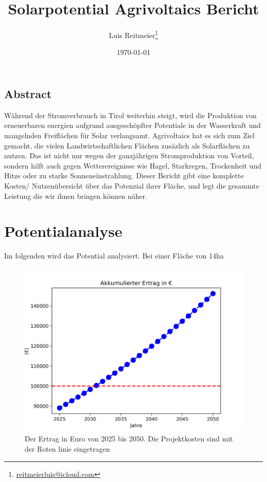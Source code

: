 \documentclass[12pt,a4paper,notitlepage]{scrreprt}
\title{\centering Solarpotential Agrivoltaics Bericht}
\author{Luis Reitmeier\thanks{\href{mailto:reitmeierluis@icloud.com}{reitmeierluis@icloud.com}}}
\date{\today}
\begin{document}

\maketitle

\vfill
    \section*{Abstract}
    Während der Stromverbrauch in Tirol weiterhin steigt, wird die Produktion von erneuerbaren energien aufgrund ausgeschöpfter Potentiale in der Wasserkraft und mangelnden Freiflächen für Solar verlangsamt. Agrivoltaics hat es sich zum Ziel gemacht, die vielen Landwirtschaftlichen Flächen zusäzlich als Solarflächen zu nutzen. Das ist nicht nur wegen der ganzjährigen Stromproduktion von Vorteil, sondern hilft auch gegen Wetterereignisse wie Hagel, Starkregen, Trockenheit und Hitze oder zu starke Sonneneinstrahlung. Dieser Bericht gibt eine komplette Kosten/ Nutzenübersicht über das Potenzial ihrer Fläche, und legt die gesammte Leistung die wir ihnen bringen können näher.



\thispagestyle{empty}

\tableofcontents

\thispagestyle{empty}
\cleardoublepage
{}
\newpage

\chapter{Potentialanalyse}

Im folgenden wird das Potential analysiert. Bei einer Fläche von 14ha

\begin{figure}
    \centering
    \includegraphics[scale=0.7]{images/Akkumulierter_Ertrag.png}
    \caption{Der Ertrag in Euro von 2025 bis 2050. Die Projektkosten sind mit der Roten linie eingetragen}
    \label{Projektkosten}
\end{figure}
\end{document}

